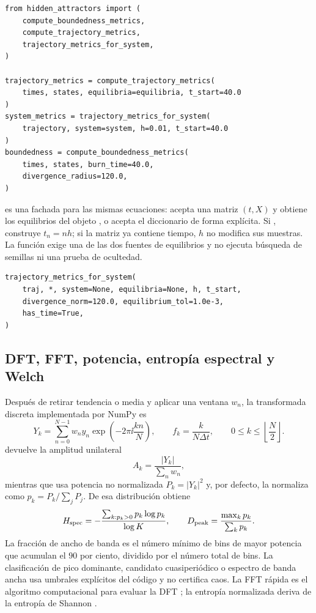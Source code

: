 \begin{verbatim}
from hidden_attractors import (
    compute_boundedness_metrics,
    compute_trajectory_metrics,
    trajectory_metrics_for_system,
)

trajectory_metrics = compute_trajectory_metrics(
    times, states, equilibria=equilibria, t_start=40.0
)
system_metrics = trajectory_metrics_for_system(
    trajectory, system=system, h=0.01, t_start=40.0
)
boundedness = compute_boundedness_metrics(
    times, states, burn_time=40.0,
    divergence_radius=120.0,
)
\end{verbatim}

 es una fachada para las mismas
ecuaciones: acepta una matriz \((t,X)\) y obtiene los equilibrios del objeto
, o acepta el diccionario  de forma
explícita. Si , construye
\(t_n=nh\); si la matriz ya contiene tiempo, \(h\) no modifica sus muestras.
La función exige una de las dos fuentes de equilibrios y no ejecuta búsqueda
de semillas ni una prueba de ocultedad.

\begin{verbatim}
trajectory_metrics_for_system(
    traj, *, system=None, equilibria=None, h, t_start,
    divergence_norm=120.0, equilibrium_tol=1.0e-3,
    has_time=True,
)
\end{verbatim}

\subsection{DFT, FFT, potencia, entropía espectral y Welch}

Después de retirar tendencia o media y aplicar una ventana \(w_n\), la
transformada discreta implementada por NumPy es
\[
 Y_k=\sum_{n=0}^{N-1}w_n y_n
       \exp\!\left(-2\pi\ii\frac{kn}{N}\right),
 \qquad
 f_k=\frac{k}{N\Delta t},
 \qquad 0\leq k\leq\left\lfloor\frac N2\right\rfloor .
\]
 devuelve la amplitud unilateral
\[
 A_k=\frac{|Y_k|}{\sum_n w_n},
\]
mientras que  usa potencia no normalizada
\(P_k=|Y_k|^2\) y, por defecto, la normaliza como
\(p_k=P_k/\sum_jP_j\). De esa distribución obtiene
\[
 H_{\rm spec}=
 -\frac{\sum_{k:p_k>0}p_k\log p_k}{\log K},
 \qquad
 D_{\rm peak}=\frac{\max_k p_k}{\sum_kp_k}.
\]
La fracción de ancho de banda es el número mínimo de bins de mayor potencia
que acumulan el \(90\) por ciento, dividido por el número total de bins. La
clasificación de pico dominante, candidato cuasiperiódico o espectro de banda
ancha usa umbrales explícitos del código y no certifica caos. La FFT rápida es
el algoritmo computacional para evaluar la DFT
\cite{CooleyTukey1965}; la entropía normalizada deriva de la entropía de
Shannon \cite{Shannon1948}.

